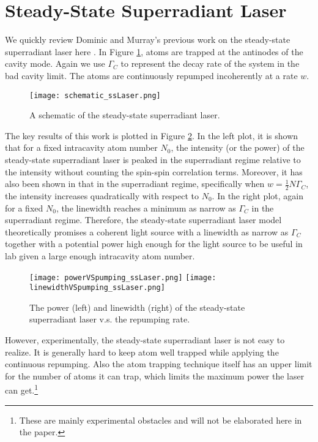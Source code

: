 \documentclass{article}
\newcommand{\gc}{\Gamma_C}
\begin{document}
\section{Steady-State Superradiant Laser}
We quickly review Dominic and Murray's previous work on the steady-state superradiant laser here \cite{fluctuation_ssLaser,ssLaser,prospects}. In Figure \ref{fig:schematic_ssLaser}, atoms are trapped at the antinodes of the cavity mode. Again we use $\gc$ to represent the decay rate of the system in the bad cavity limit. The atoms are continuously repumped incoherently at a rate $w$.

\begin{figure}[h]
\centering
\texttt{[image: schematic\_ssLaser.png]}
\caption{A schematic of the steady-state superradiant laser.}
\label{fig:schematic_ssLaser}
\end{figure}

The key results of this work is plotted in Figure \ref{fig:results_ssLaser}. In the left plot, it is shown that for a fixed intracavity atom number $N_0$, the intensity (or the power) of the steady-state superradiant laser is peaked in the superradiant regime relative to the intensity without counting the spin-spin correlation terms. Moreover, it has also been shown in \cite{ssLaser} that in the superradiant regime, specifically when $w = \frac{1}{2}N\gc$, the intensity increases quadratically with respect to $N_0$. In the right plot, again for a fixed $N_0$, the linewidth reaches a minimum as narrow as $\gc$ in the superradiant regime. Therefore, the steady-state superradiant laser model theoretically promises a coherent light source with a linewidth as narrow as $\gc$ together with a potential power high enough for the light source to be useful in lab given a large enough intracavity atom number.

\begin{figure}[h]
\texttt{[image: powerVSpumping\_ssLaser.png]}
\texttt{[image: linewidthVSpumping\_ssLaser.png]}
\caption{The power (left) and linewidth (right) of the steady-state superradiant laser v.s. the repumping rate.}
\label{fig:results_ssLaser}
\end{figure}

However, experimentally, the steady-state superradiant laser is not easy to realize. It is generally hard to keep atom well trapped while applying the continuous repumping. Also the atom trapping technique itself has an upper limit for the number of atoms it can trap, which limits the maximum power the laser can get.\footnote{These are mainly experimental obstacles and will not be elaborated here in the paper.} 
\end{document}
